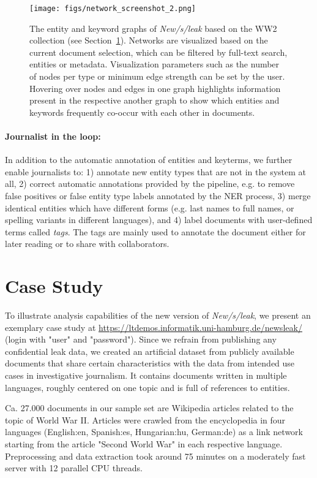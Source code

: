 \documentclass[11pt,a4paper]{article}
\begin{document}
    \begin{figure}
    \centering
	\texttt{[image: figs/network\_screenshot\_2.png]}
	\caption{The entity and keyword graphs of \emph{New/s/leak} based on the WW2 collection (see Section~\ref{casestudy}). Networks are visualized based on the current document selection, which can be filtered by full-text search, entities or metadata. Visualization parameters such as the number of nodes per type or minimum edge strength can be set by the user. 
	Hovering over nodes and edges in one graph highlights information present in the respective another graph to show which entities and keywords frequently co-occur with each other in documents.}
	\label{fig:entkey} 
	\end{figure}

\paragraph{Journalist in the loop:} In addition to the automatic annotation of entities and keyterms, we further enable journalists to: 1) annotate new entity types that are not in the system at all, 2) correct automatic annotations provided by the pipeline, e.g. to remove false positives or false entity type labels annotated by the NER process, 3) merge identical entities which have different forms (e.g. last names to full names, or spelling variants in different languages), and 4) label documents with user-defined terms called \emph{tags}. The tags are mainly used to annotate the document either for later reading or to share with collaborators.

\section{Case Study}
\label{casestudy}
To illustrate analysis capabilities of the new version of \emph{New/s/leak}, we present an exemplary case study at \url{https://ltdemos.informatik.uni-hamburg.de/newsleak/} (login with "user" and "password").
Since we refrain from publishing any confidential leak data, we created an artificial dataset from publicly available documents that share certain characteristics with the data from intended use cases in investigative journalism. It contains documents written in multiple languages, roughly centered on one topic and is full of references to entities.

Ca. 27.000 documents in our sample set are Wikipedia articles related to the topic of World War II. Articles were crawled from the encyclopedia in four languages (English:en, Spanish:es, Hungarian:hu, German:de) as a link network starting from the article "Second World War" in each respective language. Preprocessing and data extraction took around 75 minutes on a moderately fast server with 12 parallel CPU threads. 
\end{document}

